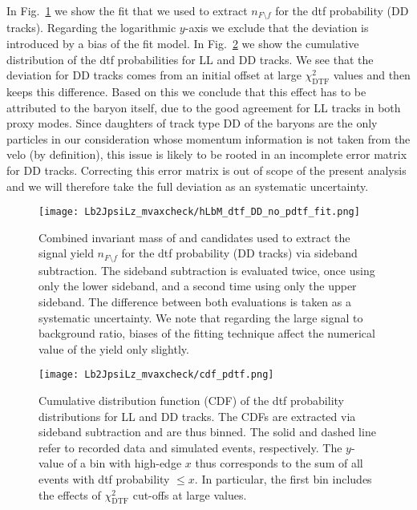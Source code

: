 In Fig.~\ref{fig:apdx_mva_xcheck_hLbM_DD_no_pdtf_fit} we show the fit that we used to extract $n_{F \setminus f}$ for the \gls{dtf} probability (\gls{DD} tracks).
Regarding the logarithmic $y$-axis we exclude that the deviation is introduced by a bias of the fit model.
In Fig.~\ref{fig:apdx_mva_xcheck_cdf_pdtf} we show the cumulative distribution of the \gls{dtf} probabilities for \gls{LL} and \gls{DD} tracks.
We see that the deviation for \gls{DD} tracks comes from an initial offset at large $\chi_\text{DTF}^2$ values and then keeps this difference.
Based on this we conclude that this effect has to be attributed to the \Lz baryon itself, due to the good agreement for \gls{LL} tracks in both proxy modes.
Since daughters of track type \gls{DD} of the \Lz baryons are the only particles in our consideration whose momentum information is not taken from the \gls{velo} (by definition), this issue is likely to be rooted in an incomplete error matrix for \gls{DD} tracks.
Correcting this error matrix is out of scope of the present analysis and we will therefore take the full deviation as an systematic uncertainty.

\begin{figure}[htbp]
    \centering
    \texttt{[image: Lb2JpsiLz\_mvaxcheck/hLbM\_dtf\_DD\_no\_pdtf\_fit.png]}
    \caption{Combined invariant mass of \jpsi and \Lz candidates used to extract the signal yield $n_{F \setminus f}$ for the \gls{dtf} probability (\gls{DD} tracks) via sideband subtraction. The sideband subtraction is evaluated twice, once using only the lower sideband, and a second time using only the upper sideband. The difference between both evaluations is taken as a systematic uncertainty. We note that regarding the large signal to background ratio, biases of the fitting technique affect the numerical value of the yield only slightly.}
    \label{fig:apdx_mva_xcheck_hLbM_DD_no_pdtf_fit}
\end{figure}

\begin{figure}[htbp]
    \centering
    \texttt{[image: Lb2JpsiLz\_mvaxcheck/cdf\_pdtf.png]}
    \caption{Cumulative distribution function (CDF) of the \gls{dtf} probability distributions for \gls{LL} and \gls{DD} tracks. The CDFs are extracted via sideband subtraction and are thus binned. The solid and dashed line refer to recorded data and simulated events, respectively. The $y$-value of a bin with high-edge $x$ thus corresponds to the sum of all events with \gls{dtf} probability $\le x$. In particular, the first bin includes the effects of $\chi_\text{DTF}^2$ cut-offs at large values.}
    \label{fig:apdx_mva_xcheck_cdf_pdtf}
\end{figure}
